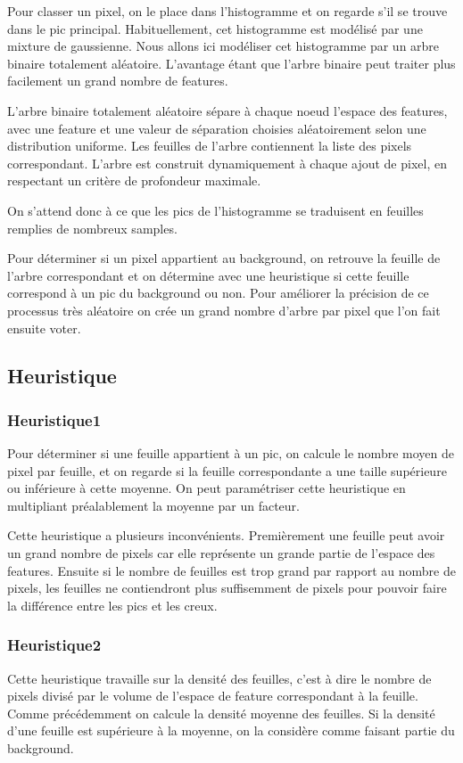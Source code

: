 \documentclass[8pt,a4paper]{report}
\begin{document}
\begin{multicols}{2}
	Pour classer un pixel, on le place dans l'histogramme et on regarde s'il se trouve dans le pic principal. 
	Habituellement, cet histogramme est modélisé par une mixture de gaussienne. Nous allons ici modéliser cet
	histogramme par un arbre binaire totalement aléatoire. L'avantage étant que l'arbre binaire peut traiter
	plus facilement un grand nombre de features.

	L'arbre binaire totalement aléatoire sépare à chaque noeud l'espace des features, avec une feature et une
	valeur de séparation choisies aléatoirement selon une distribution uniforme. Les feuilles de l'arbre 
	contiennent la liste des pixels correspondant. L'arbre est construit dynamiquement à chaque ajout de pixel,
	en respectant un critère de profondeur maximale.

	On s'attend donc à ce que les pics de l'histogramme se traduisent en feuilles remplies de nombreux samples.

	Pour déterminer si un pixel appartient au background, on retrouve la feuille de l'arbre correspondant et on
	détermine avec une heuristique si cette feuille correspond à un pic du background ou non. Pour améliorer
	la précision de ce processus très aléatoire on crée un grand nombre d'arbre par pixel que l'on fait ensuite
	voter.

	\subsection{Heuristique}
		\subsubsection{Heuristique1}
			Pour déterminer si une feuille appartient à un pic, on calcule le nombre moyen de pixel par
			feuille, et on regarde si la feuille correspondante a une taille supérieure ou inférieure
			à cette moyenne. On peut paramétriser cette heuristique en multipliant préalablement la moyenne
			par un facteur.

			Cette heuristique a plusieurs inconvénients. Premièrement une feuille peut avoir un grand nombre
			de pixels car elle représente un grande partie de l'espace des features. Ensuite si le nombre de
			feuilles est trop grand par rapport au nombre de pixels, les feuilles ne contiendront plus suffisemment
			de pixels pour pouvoir faire la différence entre les pics et les creux.
		\subsubsection{Heuristique2}
			Cette heuristique travaille sur la densité des feuilles, c'est à dire le nombre de pixels divisé par le
			volume de l'espace de feature correspondant à la feuille.  Comme précédemment on calcule la densité 
			moyenne des feuilles. Si la densité d'une feuille est supérieure à la moyenne, on la considère comme faisant
			partie du background.


\end{multicols}
\end{document}

